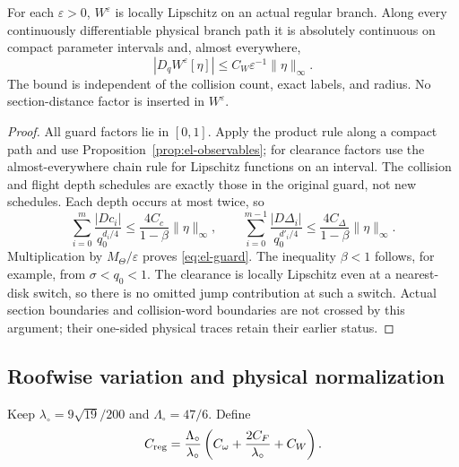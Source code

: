 \begin{theorem}
\label{thm:el-guard}
For each $\varepsilon>0$, $W^\varepsilon$ is locally Lipschitz on
an actual regular branch. Along every continuously differentiable
physical branch path it is absolutely continuous on compact parameter
intervals and, almost everywhere,
\begin{equation}\label{eq:el-guard}
 |D_qW^\varepsilon[\eta]|
       \leq C_W\varepsilon^{-1}\|\eta\|_\infty.
\end{equation}
The bound is independent of the collision count, exact labels, and
radius. No section-distance factor is inserted in $W^\varepsilon$.
\end{theorem}
\begin{proof}
All guard factors lie in $[0,1]$. Apply the product rule along a compact
path and use Proposition~\ref{prop:el-observables}; for clearance factors
use the almost-everywhere chain rule for Lipschitz functions on an interval.
The collision and flight depth schedules are exactly those in the
original guard, not new schedules. Each depth occurs at most twice, so
\[
 \sum_{i=0}^{m}\frac{|Dc_i|}{q_0^{d_i/4}}
 \leq\frac{4C_c}{1-\beta}\|\eta\|_\infty,
 \qquad
 \sum_{i=0}^{m-1}\frac{|D\Delta_i|}{q_0^{d'_i/4}}
 \leq\frac{4C_\Delta}{1-\beta}\|\eta\|_\infty.
\]
Multiplication by $M_\Theta/\varepsilon$ proves \eqref{eq:el-guard}.
The inequality $\beta<1$ follows, for example, from $\sigma<q_0<1$.
The clearance is locally Lipschitz even at a nearest-disk switch, so
there is no omitted jump contribution at such a switch. Actual section
boundaries and collision-word boundaries are not crossed by this
argument; their one-sided physical traces retain their earlier status.
\end{proof}

\subsection{Roofwise variation and physical normalization}
Keep $\lambda_\circ=9\sqrt{19}/200$ and $\Lambda_\circ=47/6$.
Define
\begin{equation}\label{eq:el-regular-constant}
 C_{\rm reg}=\frac{\Lambda_\circ}{\lambda_\circ}
       \left(C_\omega+\frac{2C_F}{\lambda_\circ}+C_W\right).
\end{equation}

